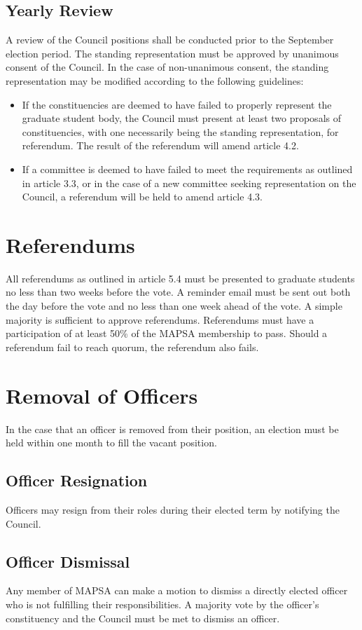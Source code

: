 \documentclass[8pt]{article}
\begin{document}
	\subsection{Yearly Review}
	A review of the Council positions shall be conducted prior to the September election period. The standing representation must be approved by unanimous consent of the Council. In the case of non-unanimous consent, the standing representation may be modified according to the following guidelines:
	\begin{itemize}
		\item If the constituencies are deemed to have failed to properly represent the graduate student body, the Council must present at least two proposals of constituencies, with one necessarily being the standing representation, for referendum. The result of the referendum will amend article 4.2.
		\item If a committee is deemed to have failed to meet the requirements as outlined in article 3.3, or in the case of a new committee seeking representation on the Council, a referendum will be held to amend article 4.3.
	\end{itemize}
	\section{Referendums}
	All referendums as outlined in article 5.4 must be presented to graduate students no less than two weeks before the vote. A reminder email must be sent out both the day before the vote and no less than one week ahead of the vote. A simple majority is sufficient to approve referendums. Referendums must have a participation of at least 50\% of the MAPSA membership to pass. Should a referendum fail to reach quorum, the referendum also fails.
	
	\section{Removal of Officers}
	In the case that an officer is removed from their position, an election must be held within one month to fill the vacant position.
	
	\subsection{Officer Resignation}
	Officers may resign from their roles during their elected term by notifying the Council.
	
	\subsection{Officer Dismissal}
	Any member of MAPSA can make a motion to dismiss a directly elected officer who is not fulfilling their responsibilities. A majority vote by the officer's constituency and the Council must be met to dismiss an officer.
	
\end{document}
